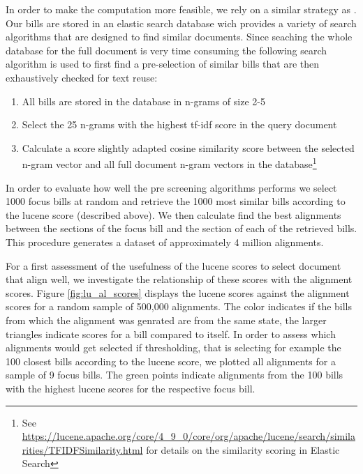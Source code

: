 \documentclass[12pt]{article} %
\begin{document}
In order to make the computation more feasible, we rely on a similar strategy as \citet{wilkerson2015tracing}. Our bills are stored in an elastic search database wich provides a variety of search algorithms that are designed to find similar documents. Since seaching the whole database for the full document is very time consuming the following search algorithm is used to first find a pre-selection of similar bills that are then exhaustively checked for text reuse:

\begin{enumerate}
\item All bills are stored in the database in n-grams of size 2-5
\item Select the 25 n-grams with the highest tf-idf score in the query document
\item Calculate a score slightly adapted cosine similarity score between the selected n-gram vector and all full document n-gram vectors in the database\footnote{See \url{https://lucene.apache.org/core/4_9_0/core/org/apache/lucene/search/similarities/TFIDFSimilarity.html} for details on the similarity scoring in Elastic Search}
\end{enumerate}

In order to evaluate how well the pre screening algorithms performs we select 1000 focus bills at random and retrieve the 1000 most similar bills according to the lucene score (described above). We then calculate find the best alignments between the sections of the focus bill and the section of each of the retrieved bills. This procedure generates a dataset of approximately 4 million alignments. 

For a first assessment of the usefulness of the lucene scores to select document that align well, we investigate the relationship of these scores with the alignment scores. Figure \ref{fig:lu_al_scores} displays the lucene scores against the alignment scores for a random sample of 500,000 alignments. The color indicates if the bills from which the alignment was genrated are from the same state, the larger triangles indicate scores for a bill compared to itself. In order to assess which alignments would get selected if thresholding, that is selecting for example the 100 closest bills according to the lucene score, we plotted all alignments for a sample of 9 focus bills. The green points indicate alignments from the 100 bills with the highest lucene scores for the respective focus bill.
\end{document}
